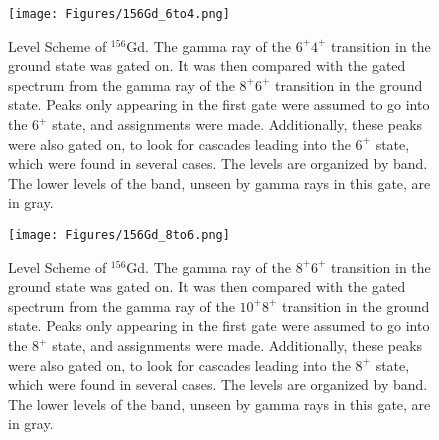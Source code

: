 \begin{figure}
    \centering
    \texttt{[image: Figures/156Gd\_6to4.png]}
    \caption{Level Scheme of $^{156}$Gd. The gamma ray of the $6^+$\rightarrow$4^+$ transition in the ground state was gated on. It was then compared with the gated spectrum from the gamma ray of the $8^+$\rightarrow$6^+$ transition in the ground state. Peaks only appearing in the first gate were assumed to go into the $6^+$ state, and assignments were made. Additionally, these peaks were also gated on, to look for cascades leading into the $6^+$ state, which were found in several cases. The levels are organized by band. The lower levels of the band, unseen by gamma rays in this gate, are in gray.}
    \label{fig:156_6to4}
\end{figure}

\begin{figure}
    \centering
    \texttt{[image: Figures/156Gd\_8to6.png]}
    \caption{Level Scheme of $^{156}$Gd. The gamma ray of the $8^+$\rightarrow$6^+$ transition in the ground state was gated on. It was then compared with the gated spectrum from the gamma ray of the $10^+$\rightarrow$8^+$ transition in the ground state. Peaks only appearing in the first gate were assumed to go into the $8^+$ state, and assignments were made. Additionally, these peaks were also gated on, to look for cascades leading into the $8^+$ state, which were found in several cases. The levels are organized by band. The lower levels of the band, unseen by gamma rays in this gate, are in gray.}
    \label{fig:156_8to6}
\end{figure}